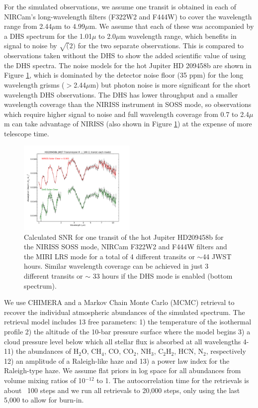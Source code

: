 \documentclass{emulateapj}
\begin{document}
For the simulated observations, we assume one transit is obtained in each of NIRCam's long-wavelength filters (F322W2 and F444W) to cover the wavelength range from 2.44$\mu$m to 4.99$\mu$m. We assume that each of these was accompanied by a DHS spectrum for the 1.01$\mu$ to 2.0$\mu$m wavelength range, which benefits in signal to noise by $\sqrt(2)$ for the two separate observations. This is compared to observations taken without the DHS to show the added scientific value of using the DHS spectra. The noise models for the hot Jupiter HD 209458b are shown in Figure \ref{fig:DHSvsNIRISS209}, which is dominated by the detector noise floor (35 ppm) for the long wavelength grisms ($>$2.44$\mu$m) but photon noise is more significant for the short wavelength DHS observations. The DHS has lower throughput and a smaller wavelength coverage than the NIRISS instrument in SOSS mode, so observations which require higher signal to noise and full wavelength coverage from 0.7 to 2.4$\mu$m can take advantage of NIRISS (also shown in Figure \ref{fig:DHSvsNIRISS209}) at the expense of more telescope time.

\begin{figure}
\centering
\includegraphics[width=0.5\textwidth]{HD209458b_solar_clear_1transit_DHS_vs_NIRISS_NIRCam_MIRILRS_R100.pdf}
\caption{Calculated SNR for one transit of the hot Jupiter HD209458b for the NIRISS SOSS mode, NIRCam F322W2 and F444W filters and the MIRI LRS mode for a total of 4 different transits or $\sim$44 JWST hours. Similar wavelength coverage can be achieved in just 3 different transits or $\sim$ 33 hours if the DHS mode is enabled (bottom spectrum).}\label{fig:DHSvsNIRISS209}
\end{figure}

We use CHIMERA and a Markov Chain Monte Carlo (MCMC) retrieval to recover the individual atmospheric abundances of the simulated spectrum. The retrieval model includes 13 free parameters: 1) the temperature of the isothermal profile 2) the altitude of the 10-bar pressure surface where the model begins 3) a cloud pressure level below which all stellar flux is absorbed at all wavelengths 4-11) the abundances of H$_2$O, CH$_4$, CO, CO$_2$, NH$_3$, C$_2$H$_2$, HCN, N$_2$, respectively 12) an amplitude of a Raleigh-like haze and 13) a power law index for the Raleigh-type haze. We assume flat priors in log space for all abundances from volume mixing ratios of 10$^{-12}$ to 1. The autocorrelation time for the retrievals is about ~100 steps and we run all retrievals to 20,000 steps, only using the last 5,000 to allow for burn-in.
\end{document}
